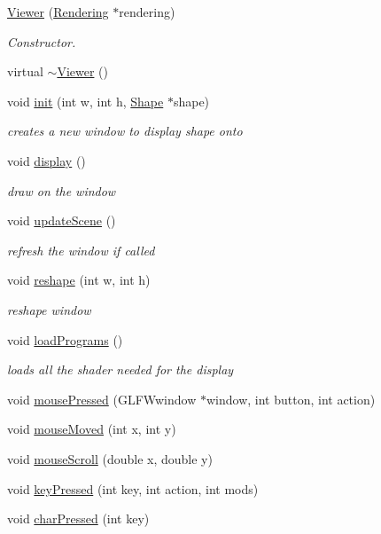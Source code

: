 \begin{DoxyCompactItemize}
\item 
\hyperlink{class_viewer_a29d3e7c2922835cbd92c285c709dbe30}{Viewer} (\hyperlink{class_rendering}{Rendering} $\ast$rendering)
\begin{DoxyCompactList}\small\item\em Constructor. \end{DoxyCompactList}\item 
virtual \hyperlink{class_viewer_a324e5a6a1532fe5eac3f3b0e4792b2da}{$\sim$\+Viewer} ()
\item 
void \hyperlink{class_viewer_a2d57e05f6d9c450431e01ffd82eb3b5e}{init} (int w, int h, \hyperlink{class_shape}{Shape} $\ast$shape)
\begin{DoxyCompactList}\small\item\em creates a new window to display shape onto \end{DoxyCompactList}\item 
void \hyperlink{class_viewer_a277a934adb86150b09d044b7cee822f8}{display} ()
\begin{DoxyCompactList}\small\item\em draw on the window \end{DoxyCompactList}\item 
void \hyperlink{class_viewer_a7deac2bd87e6c5a76c6eb600306d6096}{update\+Scene} ()
\begin{DoxyCompactList}\small\item\em refresh the window if called \end{DoxyCompactList}\item 
void \hyperlink{class_viewer_ab4e8ad8f2d8c73cc9312785e6aed9e75}{reshape} (int w, int h)
\begin{DoxyCompactList}\small\item\em reshape window \end{DoxyCompactList}\item 
void \hyperlink{class_viewer_a7afbf6081ffc5d44f4939b0d579d0b58}{load\+Programs} ()
\begin{DoxyCompactList}\small\item\em loads all the shader needed for the display \end{DoxyCompactList}\item 
void \hyperlink{class_viewer_ac2e3964b994ed24680586369b2b7a750}{mouse\+Pressed} (G\+L\+F\+Wwindow $\ast$window, int button, int action)
\item 
void \hyperlink{class_viewer_a5b0b70ce7a638a6bd3184ca4b4e73e4b}{mouse\+Moved} (int x, int y)
\item 
void \hyperlink{class_viewer_abd042d0aa5ae88ef0261d83c15ce8d4b}{mouse\+Scroll} (double x, double y)
\item 
void \hyperlink{class_viewer_a79192db7ddae958fc0ae2ee2e90cb995}{key\+Pressed} (int key, int action, int mods)
\item 
void \hyperlink{class_viewer_a12155081915ec2fcf3554534b8aa52d6}{char\+Pressed} (int key)
\end{DoxyCompactItemize}


